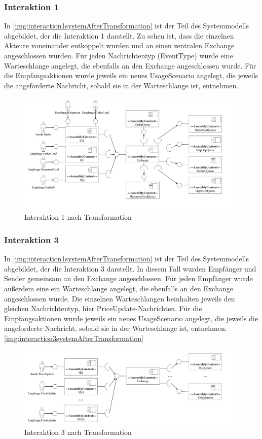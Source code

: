 \subsubsection{Interaktion 1}
In \autoref{img:interaction1systemAfterTransformation} ist der Teil des Systemmodells abgebildet, der die Interaktion 1 darstellt. Zu sehen ist, dass die einzelnen Akteure voneinander entkoppelt wurden und an einen zentralen Exchange angeschlossen wurden. Für jeden Nachrichtentyp (EventType) wurde eine Warteschlange angelegt, die ebenfalls an den Exchange angeschlossen wurde. Für die Empfangsaktionen wurde jeweils ein neues UsageScenario angelegt, die jeweils die angeforderte Nachricht, sobald sie in der Warteschlange ist, entnehmen. 
\begin{figure}
\center
  \includegraphics[width=1\textwidth]{images/evaluation/specjms/evaluationInteraktion1new.pdf}
  \caption{Interaktion 1 nach Transformation}
  \label{img:interaction1systemAfterTransformation}
\end{figure}
\subsubsection{Interaktion 3}
In \autoref{img:interaction1systemAfterTransformation} ist der Teil des Systemmodells abgebildet, der die Interaktion 3 darstellt. In diesem Fall wurden Empfänger und Sender gemeinsam an den Exchange angeschlossen. Für jeden Empfänger wurde außerdem eine ein Warteschlange angelegt, die ebenfalls an den Exchange angeschlossen wurde. Die einzelnen Warteschlangen beinhalten jeweils den gleichen Nachrichtentyp, hier PriceUpdate-Nachrichten. Für die Empfangsaktionen wurde jeweils ein neues UsageScenario angelegt, die jeweils die angeforderte Nachricht, sobald sie in der Warteschlange ist, entnehmen.
\autoref{img:interaction3systemAfterTransformation}
\begin{figure}
\center
  \includegraphics[width=1\textwidth]{images/evaluation/specjms/evaluationInteraktion3new.pdf}
  \caption{Interaktion 3 nach Transformation}
  \label{img:interaction3systemAfterTransformation}
\end{figure}


